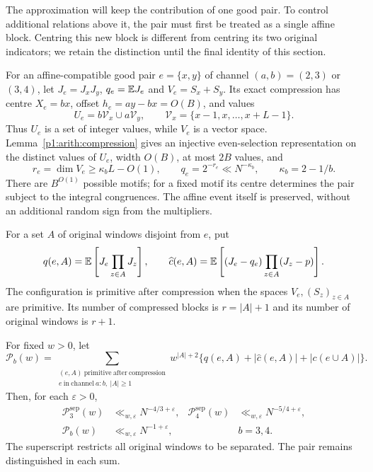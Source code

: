 The approximation will keep the contribution of one good pair.
To control additional relations above it, the pair must first be
treated as a single affine block. Centring this new block is different
from centring its two original indicators; we retain the distinction
until the final identity of this section.

For an affine-compatible good pair $e=\{x,y\}$ of channel
$(a,b)=(2,3)$ or $(3,4)$,
let $J_e=J_xJ_y$, $q_e=\mathbb E J_e$ and $V_e=S_x+S_y$.
Its exact compression has centre $X_e=bx$, offset
$h_e=ay-bx=O(B)$, and values
\[
 U_e=b\mathcal V_x\cup a\mathcal V_y,
 \qquad \mathcal V_x=\{x-1,x,\ldots,x+L-1\}.
\]
Thus $U_e$ is a set of integer values, while $V_e$ is a vector space.
Lemma~\ref{p1:arith:compression} gives an
injective even-selection representation on the distinct values of
$U_e$, width $O(B)$, at most $2B$ values, and
\begin{equation}
 r_e=\dim V_e\ge\kappa_bL-O(1),\qquad
 q_e=2^{-r_e}\ll N^{-\kappa_b},\qquad \kappa_b=2-1/b.
 \label{p1:core:compressed-rank}
\end{equation}
There are $B^{O(1)}$ possible motifs; for a fixed motif its centre
determines the pair subject to the integral congruences. The affine
event itself is preserved, without an additional random sign from the
multipliers.

For a set $A$ of original windows disjoint from $e$, put
\[
 q(e,A)=\mathbb E\left[J_e\prod_{z\in A}J_z\right],\qquad
 \widehat c(e,A)=\mathbb E\left[(J_e-q_e)\prod_{z\in A}(J_z-p)\right].
\]
The configuration is primitive after compression when the spaces
$V_e,(S_z)_{z\in A}$ are primitive. Its number of compressed blocks
is $r=|A|+1$ and its number of original windows is $r+1$.

\begin{theorem}
\label{p1:core:compressed}
For fixed $w>0$, let
\[
 \mathcal P_b(w)=\sum_{\substack{(e,A)\ \mathrm{primitive\ after\ compression}\\
                  e\ \mathrm{in\ channel}\ a:b,\ |A|\ge1}}
 w^{|A|+2}\{q(e,A)+|\widehat c(e,A)|+|c(e\cup A)|\}.
\]
Then, for each $\varepsilon>0$,
\begin{align}
 \mathcal P_3^{\mathrm{sep}}(w)&\ll_{w,\varepsilon}N^{-4/3+\varepsilon},&
 \mathcal P_4^{\mathrm{sep}}(w)&\ll_{w,\varepsilon}N^{-5/4+\varepsilon},
 \label{p1:core:compressed-separated}\\
 \mathcal P_b(w)&\ll_{w,\varepsilon}N^{-1+\varepsilon},&&b=3,4.
 \label{p1:core:compressed-all}
\end{align}
The superscript restricts all original windows to be separated. The
pair remains distinguished in each sum.
\end{theorem}

